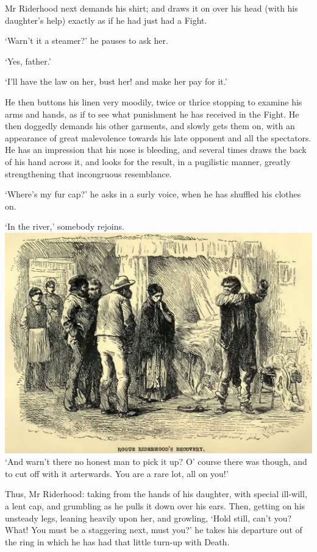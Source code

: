 Mr Riderhood next demands his shirt; and draws it on over his head (with
his daughter’s help) exactly as if he had just had a Fight.

‘Warn’t it a steamer?’ he pauses to ask her.

‘Yes, father.’

‘I’ll have the law on her, bust her! and make her pay for it.’

He then buttons his linen very moodily, twice or thrice stopping to
examine his arms and hands, as if to see what punishment he has received
in the Fight. He then doggedly demands his other garments, and slowly
gets them on, with an appearance of great malevolence towards his late
opponent and all the spectators. He has an impression that his nose is
bleeding, and several times draws the back of his hand across it, and
looks for the result, in a pugilistic manner, greatly strengthening that
incongruous resemblance.

‘Where’s my fur cap?’ he asks in a surly voice, when he has shuffled his
clothes on.

‘In the river,’ somebody rejoins.\\[2pt]

\includegraphics[scale=2.3]{03-03-01}\\[2pt]

‘And warn’t there no honest man to pick it up? O’ course there was
though, and to cut off with it arterwards. You are a rare lot, all on
you!’

Thus, Mr Riderhood: taking from the hands of his daughter, with special
ill-will, a lent cap, and grumbling as he pulls it down over his ears.
Then, getting on his unsteady legs, leaning heavily upon her, and
growling, ‘Hold still, can’t you? What! You must be a staggering next,
must you?’ he takes his departure out of the ring in which he has had
that little turn-up with Death.


